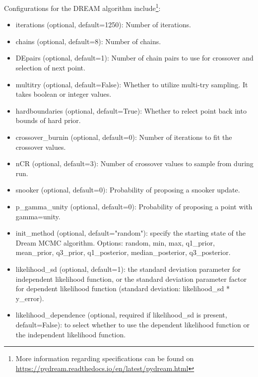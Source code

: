 Configurations for the DREAM algorithm include\footnote{More information regarding specifications can be found on \url{https://pydream.readthedocs.io/en/latest/pydream.html}}:
\begin{itemize}
    \item iterations (optional, default=1250): Number of iterations.
\item chains (optional, default=8): Number of chains.
\item DEpairs (optional, default=1): Number of chain pairs to use for crossover and selection of next point.
\item multitry (optional, default=False): Whether to utilize multi-try sampling. It takes boolean or integer values.
\item hardboundaries (optional, default=True): Whether to relect point back into bounds of hard prior.
\item crossover\_burnin (optional, default=0): Number of iterations to fit the crossover values.
\item nCR (optional, default=3): Number of crossover values to sample from during run.
\item snooker (optional, default=0): Probability of proposing a snooker update.
\item p\_gamma\_unity (optional, default=0): Probability of proposing a point with gamma=unity.
\item init\_method (optional, default="random"): specify the starting state of the Dream MCMC algorithm. Options: random, min, max, q1\_prior, mean\_prior, q3\_prior, q1\_posterior, median\_posterior, q3\_posterior.
\item likelihood\_sd (optional, default=1): the standard deviation parameter for independent likelihood function, or the standard deviation parameter factor for dependent likelihood function (standard deviation: likelihood\_sd * y\_error).
\item likelihood\_dependence (optional, required if likelihood\_sd is present, default=False): to select whether to use the dependent likelihood function or the independent likelihood function.
\end{itemize}
